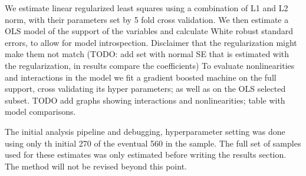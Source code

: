 We estimate linear regularized least squares using a combination of L1 and L2 norm, with their parameters set by 5 fold cross validation. 
We then estimate a OLS model of the support of the variables and calculate White robust standard errors, to allow for model introspection. 
Disclaimer that the regularization might make them not match (TODO: add set with normal SE that is estimated with the regularization, in results compare the coefficients) 
To evaluate nonlinearities and interactions  in the model we fit a gradient boosted machine on the full support, cross validating its hyper parameters; as well as on the OLS selected subset.  TODO add graphs showing interactions and nonlinearities; table with model comparisons.


The initial analysis pipeline and debugging, hyperparameter setting was done using only th initial 270 of the eventual 560 in the sample. The full set of samples used for these estimates was only estimated before writing the results section. The method will not be revised beyond this point.

